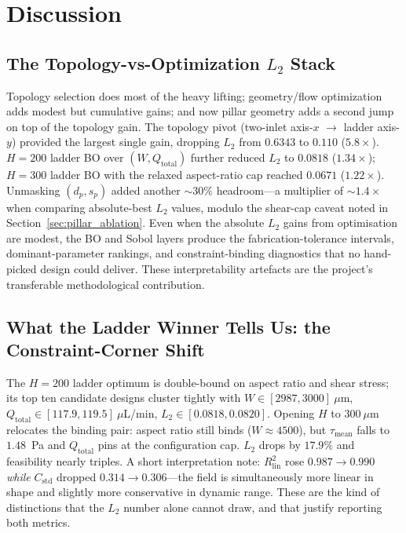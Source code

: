\documentclass[12pt]{article}
\begin{document}
\section{Discussion}

\subsection{The Topology-vs-Optimization $L_2$ Stack}
Topology selection does most of the heavy lifting; geometry/flow optimization adds modest but cumulative gains; and now pillar geometry adds a second jump on top of the topology gain. The topology pivot (two-inlet axis-$x$ $\to$ ladder axis-$y$) provided the largest single gain, dropping $L_2$ from $0.6343$ to $0.110$ ($5.8\times$). $H = 200$ ladder BO over $(W, Q_{\text{total}})$ further reduced $L_2$ to $0.0818$ ($1.34\times$); $H = 300$ ladder BO with the relaxed aspect-ratio cap reached $0.0671$ ($1.22\times$). Unmasking $(d_p, s_p)$ added another $\sim 30\%$ headroom---a multiplier of $\sim 1.4\times$ when comparing absolute-best $L_2$ values, modulo the shear-cap caveat noted in Section~\ref{sec:pillar_ablation}. Even when the absolute $L_2$ gains from optimisation are modest, the BO and Sobol layers produce the fabrication-tolerance intervals, dominant-parameter rankings, and constraint-binding diagnostics that no hand-picked design could deliver. These interpretability artefacts are the project's transferable methodological contribution.

\subsection{What the Ladder Winner Tells Us: the Constraint-Corner Shift}
The $H = 200$ ladder optimum is double-bound on aspect ratio and shear stress; its top ten candidate designs cluster tightly with $W \in [2987, 3000]~\mu$m, $Q_{\text{total}} \in [117.9, 119.5]~\mu$L/min, $L_2 \in [0.0818, 0.0820]$. Opening $H$ to $300~\mu$m relocates the binding pair: aspect ratio still binds ($W \approx 4500$), but $\tau_{\text{mean}}$ falls to $1.48$~Pa and $Q_{\text{total}}$ pins at the configuration cap. $L_2$ drops by $17.9\%$ and feasibility nearly triples. A short interpretation note: $R^2_{\text{lin}}$ rose $0.987 \to 0.990$ \emph{while} $C_{\text{std}}$ dropped $0.314 \to 0.306$---the field is simultaneously more linear in shape and slightly more conservative in dynamic range. These are the kind of distinctions that the $L_2$ number alone cannot draw, and that justify reporting both metrics.
\end{document}
